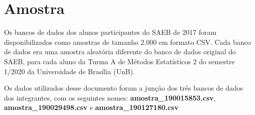 
\chapter{Amostra}
Os bancos de dados dos alunos participantes do SAEB de 2017 foram disponibilizados como
amostras de tamanho 2.000 em formato CSV. Cada banco de dados era uma amostra aleatória
diferente do banco de dados original do SAEB, para cada aluno da Turma A
de Métodos Estatísticos 2 do semestre 1/2020 da Universidade de Brasília (UnB).

Os dados utilizados desse documento foram a junção dos três bancos de dados dos integrantes,
com os seguintes nomes: \textbf{amostra\_190015853.csv}, \textbf{amostra\_190029498.csv} e 
\textbf{amostra\_190127180.csv}